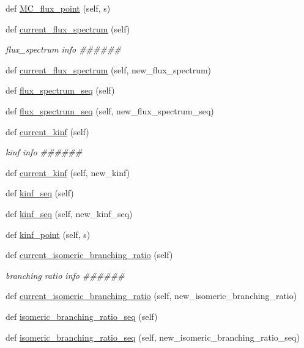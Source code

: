 \begin{DoxyCompactItemize}
\item 
def \hyperlink{classonix_1_1sequence_1_1Sequence_ac27e3151316ac349ee31d5eb4a773d4d}{M\+C\+\_\+flux\+\_\+point} (self, s)
\item 
def \hyperlink{classonix_1_1sequence_1_1Sequence_ad182d0b55e99defe329af078234141d6}{current\+\_\+flux\+\_\+spectrum} (self)
\begin{DoxyCompactList}\small\item\em flux\+\_\+spectrum info \#\#\#\#\#\# \end{DoxyCompactList}\item 
def \hyperlink{classonix_1_1sequence_1_1Sequence_a9140653c7614eedb267aec10cc5b1862}{current\+\_\+flux\+\_\+spectrum} (self, new\+\_\+flux\+\_\+spectrum)
\item 
def \hyperlink{classonix_1_1sequence_1_1Sequence_a36aa488bccd1ef500741808076fff801}{flux\+\_\+spectrum\+\_\+seq} (self)
\item 
def \hyperlink{classonix_1_1sequence_1_1Sequence_a92e2986096244c35a1bb5ab86aa24db4}{flux\+\_\+spectrum\+\_\+seq} (self, new\+\_\+flux\+\_\+spectrum\+\_\+seq)
\item 
def \hyperlink{classonix_1_1sequence_1_1Sequence_a6edc4c50dc07bb7d0c6dcfd5a644e28c}{current\+\_\+kinf} (self)
\begin{DoxyCompactList}\small\item\em kinf info \#\#\#\#\#\# \end{DoxyCompactList}\item 
def \hyperlink{classonix_1_1sequence_1_1Sequence_a5aa7ff064c123d8d1a7e2fc4cec77608}{current\+\_\+kinf} (self, new\+\_\+kinf)
\item 
def \hyperlink{classonix_1_1sequence_1_1Sequence_a26c2778e995e1732009b0748bc36104f}{kinf\+\_\+seq} (self)
\item 
def \hyperlink{classonix_1_1sequence_1_1Sequence_ab727e89adfff510786e97320d45953aa}{kinf\+\_\+seq} (self, new\+\_\+kinf\+\_\+seq)
\item 
def \hyperlink{classonix_1_1sequence_1_1Sequence_a55d08be5c4823700d48d04a0691e0ab0}{kinf\+\_\+point} (self, s)
\item 
def \hyperlink{classonix_1_1sequence_1_1Sequence_ae09f34f2cb44a6240d404704f07b4b05}{current\+\_\+isomeric\+\_\+branching\+\_\+ratio} (self)
\begin{DoxyCompactList}\small\item\em branching ratio info \#\#\#\#\#\# \end{DoxyCompactList}\item 
def \hyperlink{classonix_1_1sequence_1_1Sequence_abb39ff0c6a2619aac3555dffeae25401}{current\+\_\+isomeric\+\_\+branching\+\_\+ratio} (self, new\+\_\+isomeric\+\_\+branching\+\_\+ratio)
\item 
def \hyperlink{classonix_1_1sequence_1_1Sequence_ae7c83b9da70a30c2411671f5b12fbc7d}{isomeric\+\_\+branching\+\_\+ratio\+\_\+seq} (self)
\item 
def \hyperlink{classonix_1_1sequence_1_1Sequence_a67b5c26a9a7b347b1ae7aef8de995895}{isomeric\+\_\+branching\+\_\+ratio\+\_\+seq} (self, new\+\_\+isomeric\+\_\+branching\+\_\+ratio\+\_\+seq)
\end{DoxyCompactItemize}

